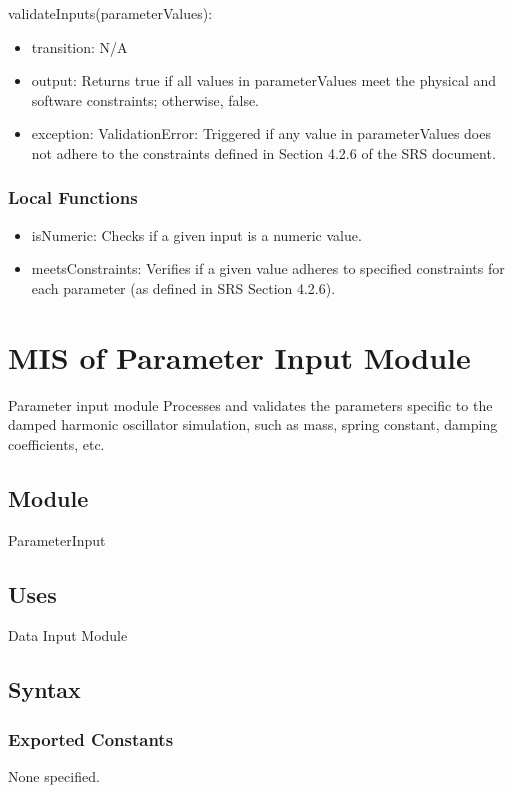 \documentclass[12pt, titlepage]{article}
\begin{document}
\noindent validateInputs(parameterValues):
\begin{itemize}
\item transition: N/A
\item output: Returns true if all values in parameterValues meet the physical and software constraints; otherwise, false.
\item exception: ValidationError: Triggered if any value in parameterValues does not adhere to the constraints defined in Section 4.2.6 of the SRS document.
\end{itemize}

\subsubsection{Local Functions}

\begin{itemize}
  \item isNumeric: Checks if a given input is a numeric value.
  \item meetsConstraints: Verifies if a given value adheres to specified constraints for each parameter (as defined in SRS Section 4.2.6).
\end{itemize}



\section{MIS of Parameter Input Module} \label{mPI}

Parameter input module Processes and validates the parameters specific to the damped harmonic oscillator
simulation, such as mass, spring constant, damping coefficients, etc.

\subsection{Module}
ParameterInput

\subsection{Uses}
Data Input Module

\subsection{Syntax}

\subsubsection{Exported Constants}
None specified.
\end{document}
